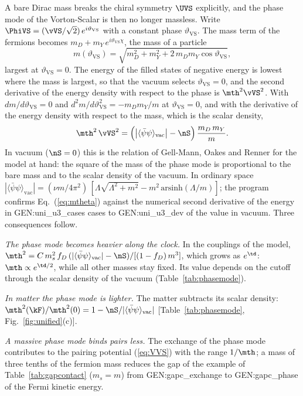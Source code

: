 A bare Dirac mass breaks the chiral symmetry $\UVS$ explicitly, and the phase mode of the
Vorton-Scalar is then no longer massless. Write $\PhiVS=(\vVS/\sqrt2)\,e^{i\vartheta_{\mathrm{VS}}}$
with a constant phase $\vartheta_{\mathrm{VS}}$. The mass term of the fermions becomes
$m_D+m_Y\,e^{i\vartheta_{\mathrm{VS}}\chi}$, the mass of a particle
\begin{equation}
m(\vartheta_{\mathrm{VS}})=\sqrt{m_D^{2}+m_Y^{2}+2\,m_Dm_Y\cos\vartheta_{\mathrm{VS}}},
\end{equation}
largest at $\vartheta_{\mathrm{VS}}=0$. The energy of the filled states of negative energy is lowest
where the mass is largest, so that the vacuum selects $\vartheta_{\mathrm{VS}}=0$, and the second
derivative of the energy density with respect to the phase is $\mth^{2}\vVS^{2}$. With
$dm/d\vartheta_{\mathrm{VS}}=0$ and $d^{2}m/d\vartheta_{\mathrm{VS}}^{2}=-m_Dm_Y/m$ at
$\vartheta_{\mathrm{VS}}=0$, and with the derivative of the energy density with respect to the mass,
which is the scalar density,
\begin{equation}
\mth^{2}\,\vVS^{2}=\Big(\big|\langle\bar\psi\psi\rangle_{\mathrm{vac}}\big|-\nS\Big)\,\frac{m_D\,m_Y}{m} .
\label{eq:mtheta}
\end{equation}
In vacuum ($\nS=0$) this is the relation of Gell-Mann, Oakes and Renner \cite{GellMannOakesRenner1968}
for the model at hand: the square of the mass of the phase mode is proportional to the bare mass and
to the scalar density of the vacuum. In ordinary space
$|\langle\bar\psi\psi\rangle_{\mathrm{vac}}|=(\nu m/4\pi^{2})\,[\Lambda\sqrt{\Lambda^{2}+m^{2}}-m^{2}\,\mathrm{arsinh}(\Lambda/m)]$;
the program confirms Eq.~(\ref{eq:mtheta}) against the numerical second derivative of the energy in
{{GEN:uni_u3_cases}} cases to {{GEN:uni_u3_dev}} of the value in vacuum. Three consequences follow.

\emph{The phase mode becomes heavier along the clock.} In the couplings of the model,
$\mth^{2}=C\,m_s^{2}\,f_D\,(|\langle\bar\psi\psi\rangle_{\mathrm{vac}}|-\nS)/[(1-f_D)\,m^{3}]$, which
grows as $e^{\td}$: $\mth\propto e^{\td/2}$, while all other masses stay fixed. Its value depends on
the cutoff through the scalar density of the vacuum (Table~\ref{tab:phasemode}).

\emph{In matter the phase mode is lighter.} The matter subtracts its scalar density:
$\mth^{2}(\kF)/\mth^{2}(0)=1-\nS/|\langle\bar\psi\psi\rangle_{\mathrm{vac}}|$
[Table~\ref{tab:phasemode}, Fig.~\ref{fig:unified}(c)].

\emph{A massive phase mode binds pairs less.} The exchange of the phase mode contributes to the
pairing potential (\ref{eq:VVS}) with the range $1/\mth$; a mass of three tenths of the fermion
mass reduces the gap of the example of Table~\ref{tab:gapcontact} ($m_s=m$) from
{{GEN:gapc_exchange}} to {{GEN:gapc_phase}} of the Fermi kinetic energy.

